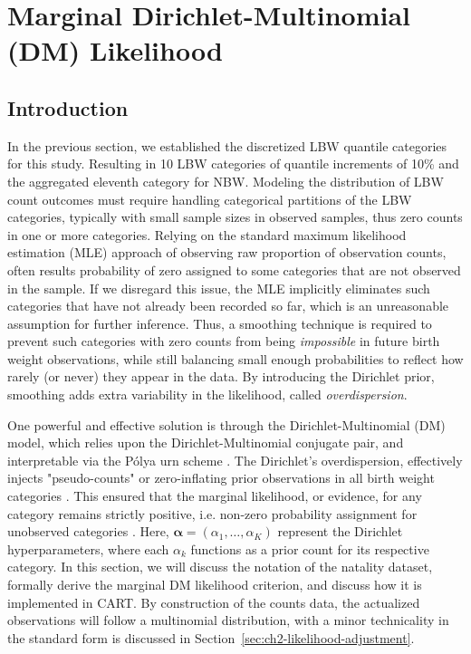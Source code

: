 \section{Marginal Dirichlet-Multinomial (DM) Likelihood}
\label{sec:ch2-likelihood}
\subsection{Introduction}
\label{sec:ch2-likelihood-introduction}

In the previous section, we established the discretized LBW quantile categories for this study. Resulting in 10 LBW categories of quantile increments of 10\% and the aggregated eleventh category for NBW. Modeling the distribution of LBW count outcomes must require handling categorical partitions of the LBW categories, typically with small sample sizes in observed samples, thus zero counts in one or more categories. Relying on the standard maximum likelihood estimation (MLE) approach of observing raw proportion of observation counts, often results probability of zero assigned to some categories that are not observed in the sample. If we disregard this issue, the MLE implicitly eliminates such categories that have not already been recorded so far, which is an unreasonable assumption for further inference. Thus, a smoothing technique is required to prevent such categories with zero counts from being \emph{impossible} in future birth weight observations, while still balancing small enough probabilities to reflect how rarely (or never) they appear in the data. By introducing the Dirichlet prior, smoothing adds extra variability in the likelihood, called \textit{overdispersion}.

One powerful and effective solution is through the Dirichlet-Multinomial (DM) model, which relies upon the Dirichlet-Multinomial conjugate pair, and interpretable via the Pólya urn scheme \parencite{mimno_polya, gundersen2020dirichlet-multinomial, minka2000estimating}. The Dirichlet's overdispersion, effectively injects "pseudo-counts" or zero-inflating prior observations in all birth weight categories \parencite{mimno_polya, wiki:dirichlet-multinomial}. This ensured that the marginal likelihood, or evidence, for any category remains strictly positive, i.e. non-zero probability assignment for unobserved categories \parencite{wiki:dirichlet-multinomial}. Here, \(\boldsymbol{\alpha} = (\alpha_1, \dots, \alpha_K)\) represent the Dirichlet hyperparameters, where each \(\alpha_k\) functions as a prior count for its respective category. In this section, we will discuss the notation of the natality dataset, formally derive the marginal DM likelihood criterion, and discuss how it is implemented in CART. By construction of the counts data, the actualized observations will follow a multinomial distribution, with a minor technicality in the standard form is discussed in Section~\ref{sec:ch2-likelihood-adjustment}. 

